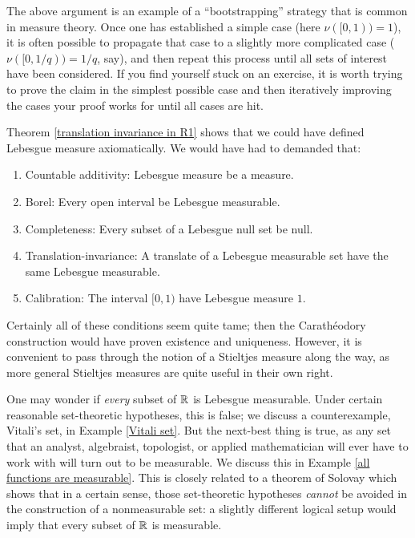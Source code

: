\begin{subsec}
The above argument is an example of a ``bootstrapping'' strategy that is common in measure theory.
Once one has established a simple case (here $\nu([0, 1)) = 1$), it is often possible to propagate that case to a slightly more complicated case ($\nu([0, 1/q)) = 1/q$, say), and then repeat this process until all sets of interest have been considered.
If you find yourself stuck on an exercise, it is worth trying to prove the claim in the simplest possible case and then iteratively improving the cases your proof works for until all cases are hit.
\end{subsec}

\begin{subsec}
Theorem \ref{translation invariance in R1} shows that we could have defined Lebesgue measure axiomatically. We would have had to demanded that:
\begin{enumerate}
\item Countable additivity: Lebesgue measure be a measure.
\item Borel: Every open interval be Lebesgue measurable.
\item Completeness: Every subset of a Lebesgue null set be null.
\item Translation-invariance: A translate of a Lebesgue measurable set have the same Lebesgue measurable.
\item Calibration: The interval $[0, 1)$ have Lebesgue measure $1$.
\end{enumerate}
Certainly all of these conditions seem quite tame; then the Carathéodory construction would have proven existence and uniqueness.
However, it is convenient to pass through the notion of a Stieltjes measure along the way, as more general Stieltjes measures are quite useful in their own right.
\end{subsec}

\begin{subsec}
One may wonder if \emph{every} subset of $\mathbb{R}$ is Lebesgue measurable.
Under certain reasonable set-theoretic hypotheses, this is false; we discuss a counterexample, Vitali's set, in Example \ref{Vitali set}.
But the next-best thing is true, as any set that an analyst, algebraist, topologist, or applied mathematician will ever have to work with will turn out to be measurable. We discuss this in Example \ref{all functions are measurable}.
This is closely related to a theorem of Solovay \cite{Solovay1970} which shows that in a certain sense, those set-theoretic hypotheses \emph{cannot} be avoided in the construction of a nonmeasurable set: a slightly different logical setup would imply that every subset of $\mathbb{R}$ is measurable.
\end{subsec}

